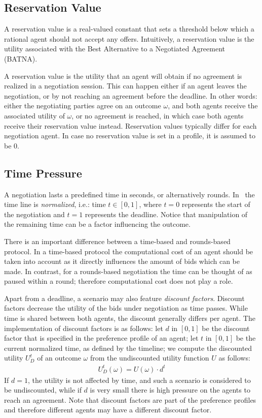 \documentclass[]{article}
\begin{document}
\subsection{Reservation Value}
A reservation value is a real-valued constant that sets a threshold below which a rational agent should not accept any offers. Intuitively, a reservation value is the utility associated with the Best Alternative to a Negotiated Agreement (BATNA).

A reservation value is the utility that an agent will obtain if no agreement is realized in a negotiation session. This can happen either if an agent leaves the negotiation, or by not reaching an agreement before the deadline. In other words: either the negotiating parties agree on an outcome $\omega$, and both agents receive the associated utility of $\omega$, or no agreement is reached, in which case both agents receive their reservation value instead. Reservation values typically differ for each negotiation agent. In case no reservation value is set in a profile, it is assumed to be 0.


\subsection{Time Pressure}
A negotiation lasts a predefined time in seconds, or alternatively rounds. In \Genius~the time line is \emph{normalized}, i.e.: time $t \in [0, 1]$, where $t = 0$ represents the start of the negotiation and $t = 1$ represents the deadline. Notice that manipulation of the remaining time can be a factor influencing the outcome.

There is an important difference between a time-based and rounds-based protocol. In a time-based protocol the computational cost of an agent should be taken into account as it directly influences the amount of bids which can be made. In contrast, for a rounds-based negotiation the time can be thought of as paused within a round; therefore computational cost does not play a role.

Apart from a deadline, a scenario may also feature \emph{discount factors}. Discount factors decrease the utility of the bids under negotiation as time passes. While time is shared between both agents, the discount generally differs per agent. The implementation of discount factors is as follows: let $d$ in $[0, 1]$ be the discount factor that is specified in the preference profile of an agent; let $t$ in $[0, 1]$ be the current normalized time, as defined by the timeline; we compute the discounted utility $U_D^t$ of an outcome $\omega$ from the undiscounted utility function $U$ as follows:
\begin{eqnarray}
U_D^t(\omega) = U(\omega) \cdot d^t
\end{eqnarray}
If $d = 1$, the utility is not affected by time, and such a scenario is considered to be undiscounted, while if $d$ is very small there is high pressure on the agents to reach an agreement. Note that discount factors are part of the preference profiles and therefore different agents may have a different discount factor.
\end{document}
